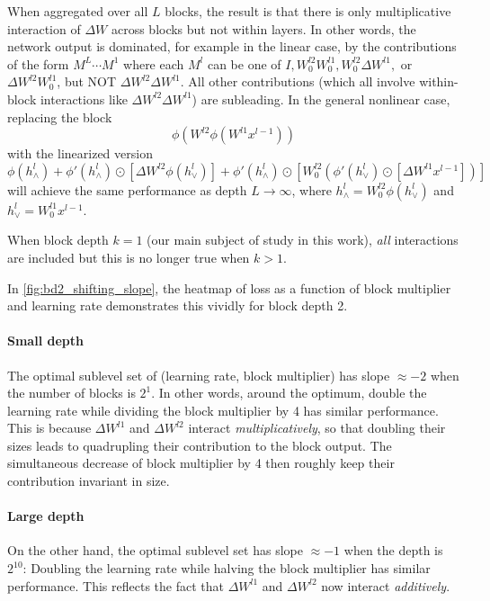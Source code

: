 When aggregated over all $L$ blocks, the result is that there is only multiplicative interaction of $\Delta W$ across blocks but not within layers.
In other words, the network output is dominated, for example in the linear case, by the contributions of the form
$M^L \cdots M^1$
where each $M^l$ can be one of $I, W_0^{l2} W_0^{l1}, W_0^{l2} \Delta W^{l1},$ or $\Delta W^{l2} W_0^{l1}$, but NOT $\Delta W^{l2} \Delta W^{l1}$.
All other contributions (which all involve within-block interactions like $\Delta W^{l2} \Delta W^{l1}$) are subleading. 
In the general nonlinear case, replacing the block 
\begin{equation*}
    \phi(W^{l2}\phi(W^{l1} x^{l-1}))    
\end{equation*}
with the linearized version 
\begin{equation*}
    \phi(h^l_\wedge) + \phi'(h^l_\wedge) \odot [\Delta W^{l2}\phi(h^l_\vee)] + \phi'(h^l_\wedge) \odot [W_0^{l2} (\phi'(h^l_\vee) \odot [\Delta W^{l1} x^{l-1}])]    
\end{equation*}
will achieve the same performance as depth $L \to \infty$,
where $h^l_\wedge = W_0^{l2}\phi(h^l_\vee)$ and $h^l_\vee = W_0^{l1} x^{l-1}$.

When block depth $k=1$ (our main subject of study in this work), \emph{all} interactions are included but this is no longer true when $k>1$.

In \cref{fig:bd2_shifting_slope}, the heatmap of loss as a function of block multiplier and learning rate demonstrates this vividly for block depth 2.

\paragraph{Small depth}
The optimal sublevel set of (learning rate, block multiplier) has slope $\approx -2$ when the number of blocks is $2^1$. In other words, around the optimum, double the learning rate while dividing the block multiplier by 4 has similar performance. This is because $\Delta W^{l1}$ and $\Delta W^{l2}$ interact \emph{multiplicatively}, so that doubling their sizes leads to quadrupling their contribution to the block output. The simultaneous decrease of block multiplier by 4 then roughly keep their contribution invariant in size.

\paragraph{Large depth}
On the other hand, the optimal sublevel set has slope $\approx -1$ when the depth is $2^{10}$: Doubling the learning rate while halving the block multiplier has similar performance. This reflects the fact that  $\Delta W^{l1}$ and $\Delta W^{l2}$ now interact \emph{additively}. 

